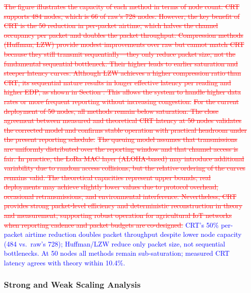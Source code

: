 \documentclass[pdflatex,sn-mathphys-num]{sn-jnl}
\theoremstyle{thmstyleone}
\theoremstyle{thmstyletwo}
\theoremstyle{thmstylethree}
\begin{document}
{\textcolor{red}{\sout{The figure illustrates the capacity of each method in terms of node count. CRT supports 484 nodes, which is 66 of raw’s 728 nodes. However, the key benefit of CRT is the 50 reduction in per‑packet airtime, which halves the channel occupancy per packet and doubles the packet throughput. Compression methods (Huffman, LZW) provide modest improvements over raw but cannot match CRT because they still transmit sequentially---they only reduce packet size, not the fundamental sequential bottleneck. Their higher leads to earlier saturation and steeper latency curves. Although LZW achieves a higher compression ratio than CRT, its sequential nature results in longer effective latency per reading and higher EDP, as shown in Section . This allows the system to handle higher data rates or more frequent reporting without increasing congestion.}}
\textcolor{red}{\sout{For the current deployment of 50 nodes, all methods remain below saturation. The close agreement between measured and theoretical CRT latency at 50 nodes validates the corrected model and confirms stable operation with practical headroom under the present reporting schedule.}}
\textcolor{red}{\sout{The queuing model assumes that transmissions are uniformly distributed over the reporting window and that channel access is fair. In practice, the LoRa MAC layer (ALOHA‑based) may introduce additional variability due to random access collisions, but the relative ordering of the curves remains valid. The theoretical capacities represent upper bounds; real deployments may achieve slightly lower values due to protocol overhead, occasional retransmissions, and environmental interference. Nevertheless, CRT provides strong packet-level efficiency and deterministic reconstruction in theory and measurement, supporting robust operation for agricultural IoT networks when reporting cadence and packet budgets are co-designed.}}
\textcolor{blue}{CRT’s 50\% per-packet airtime reduction doubles packet throughput despite lower node capacity (484 vs.\ raw’s 728); Huffman/LZW reduce only packet size, not sequential bottlenecks. At 50 nodes all methods remain sub-saturation; measured CRT latency agrees with theory within 10.4\%.}

\subsubsection{Strong and Weak Scaling Analysis}
\label{subsubsec:scaling_analysis}

}
\end{document}
